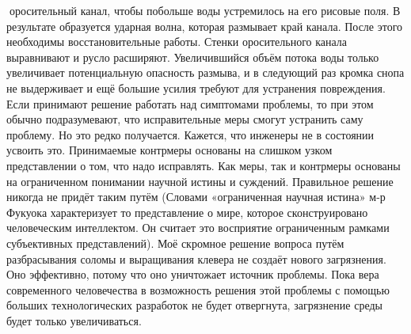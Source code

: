 \documentclass[a4paper]{book}
\begin{document}
оросительный канал, чтобы побольше воды устремилось на его рисовые поля. В результате
образуется ударная волна, которая размывает край канала. После этого необходимы
восстановительные работы. Стенки оросительного канала выравнивают и русло расширяют.
Увеличившийся объём потока воды только увеличивает потенциальную опасность размыва, и
в следующий раз кромка снопа не выдерживает и ещё большие усилия требуют для
устранения повреждения.
Если принимают решение работать над симптомами проблемы, то при этом обычно
подразумевают, что исправительные меры смогут устранить саму проблему. Но это редко
получается. Кажется, что инженеры не в состоянии усвоить это. Принимаемые контрмеры
основаны на слишком узком представлении о том, что надо исправлять. Как меры, так и
контрмеры основаны на ограниченном понимании научной истины и суждений. Правильное
решение никогда не придёт таким путём (Словами «ограниченная научная истина» м-р
Фукуока характеризует то представление о мире, которое сконструировано человеческим
интеллектом. Он считает это восприятие ограниченным рамками субъективных
представлений).
Моё скромное решение вопроса путём разбрасывания соломы и выращивания клевера
не создаёт нового загрязнения. Оно эффективно, потому что оно уничтожает источник
проблемы. Пока вера современного человечества в возможность решения этой проблемы с
помощью больших технологических разработок не будет отвергнута, загрязнение среды будет
только увеличиваться.
\end{document}
